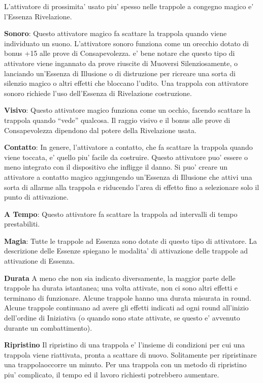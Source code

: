 \documentclass[a4paper,11pt,twoside,openany]{dndbook}
\begin{document}
L'attivatore di prossimita' usato piu' spesso nelle trappole a congegno magico e' l'Essenza Rivelazione.

\textbf{Sonoro}: Questo attivatore magico fa scattare la trappola quando viene individuato un suono. L'attivatore sonoro funziona come un orecchio dotato di bonus +15 alle prove di Consapevolezza. e' bene notare che questo tipo di attivatore viene ingannato da prove riuscite di Muoversi Silenziosamente, o lanciando un'Essenza di Illusione o di distruzione per ricreare una sorta di silenzio magico o altri effetti che bloccano l'udito. Una trappola con attivatore sonoro richiede l'uso dell'Essenza di Rivelazione costruzione.

\textbf{Visivo}: Questo attivatore magico funziona come un occhio, facendo scattare la trappola quando ``vede'' qualcosa. Il raggio visivo e il bonus alle prove di Consapevolezza dipendono dal potere della Rivelazione usata.

\textbf{Contatto}: In genere, l'attivatore a contatto, che fa scattare la trappola quando viene toccata, e' quello piu' facile da costruire. Questo attivatore puo' essere o meno integrato con il dispositivo che infligge il danno. Si puo' creare un attivatore a contatto magico aggiungendo un'Essenza di Illusione che attivi una sorta di allarme alla trappola e riducendo l'area di effetto fino a selezionare solo il punto di attivazione.

\textbf{A Tempo}: Questo attivatore fa scattare la trappola ad intervalli di tempo prestabiliti.

\textbf{Magia}: Tutte le trappole ad Essenza sono dotate di questo tipo di attivatore. La descrizione delle Essenze spiegano le modalita' di attivazione delle trappole ad attivazione di Essenza. 

\textbf{Durata}
A meno che non sia indicato diversamente, la maggior parte delle trappole ha durata istantanea; una volta attivate, non ci sono altri effetti e terminano di funzionare. Alcune trappole hanno una durata misurata in round. Alcune trappole continuano ad avere gli effetti indicati ad ogni round all'inizio dell'ordine di Iniziativa (o quando sono state attivate, se questo e' avvenuto durante un combattimento).

\textbf{Ripristino}
Il ripristino di una trappola e' l'insieme di condizioni per cui una trappola viene riattivata, pronta a scattare di nuovo. Solitamente per ripristinare una trappolaoccorre un minuto. Per una trappola con un metodo di ripristino piu' complicato, il tempo ed il lavoro richiesti potrebbero aumentare.
\end{document}
